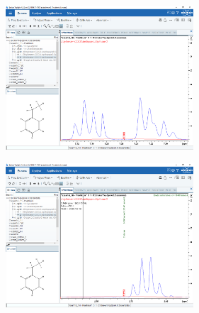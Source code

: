 \documentclass[a4paper]{article}
\newenvironment{Figure}
	{\par\medskip\noindent\minipage{\linewidth}}
	{\endminipage\par\medskip}
\begin{document}
\begin{multicols*}{2}
				\begin{Figure}
					\centering
					\includegraphics[trim={9.8cm 0.6cm 0cm 5.4cm},clip,width=7cm]{images/I.PNG}
					\label{fig:ct}
				\end{Figure}
				
				\begin{Figure}
					\centering
					\includegraphics[trim={9.8cm 0.6cm 0cm 5.4cm},clip,width=7cm]{images/II.PNG}
					\label{fig:3d}
				\end{Figure}
				
	
			
	\end{multicols*}
\end{document}
